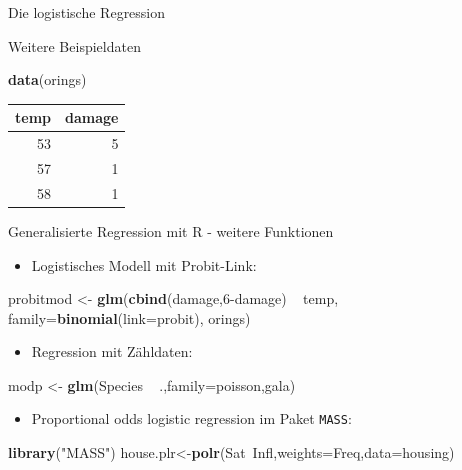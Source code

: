 \documentclass[ignorenonframetext,]{beamer}
\newenvironment{Shaded}{}{}
\newcommand{\KeywordTok}[1]{\textcolor[rgb]{0.00,0.44,0.13}{\textbf{{#1}}}}
\newcommand{\DataTypeTok}[1]{\textcolor[rgb]{0.56,0.13,0.00}{{#1}}}
\newcommand{\DecValTok}[1]{\textcolor[rgb]{0.25,0.63,0.44}{{#1}}}
\newcommand{\StringTok}[1]{\textcolor[rgb]{0.25,0.44,0.63}{{#1}}}
\newcommand{\NormalTok}[1]{{#1}}
\providecommand{\tightlist}{%
\setlength{\itemsep}{0pt}\setlength{\parskip}{0pt}}
\begin{document}
\begin{frame}[fragile]{Die logistische Regression}
\begin{block}{Weitere Beispieldaten}
\begin{Shaded}
\begin{Highlighting}[]
\KeywordTok{data}\NormalTok{(orings)}
\end{Highlighting}
\end{Shaded}

\begin{longtable}[]{@{}rr@{}}
\toprule
temp & damage\tabularnewline
\midrule
\endhead
53 & 5\tabularnewline
57 & 1\tabularnewline
58 & 1\tabularnewline
\bottomrule
\end{longtable}

\end{block}

\begin{block}{Generalisierte Regression mit R - weitere Funktionen}

\begin{itemize}
\tightlist
\item
  Logistisches Modell mit Probit-Link:
\end{itemize}

\begin{Shaded}
\begin{Highlighting}[]
\NormalTok{probitmod <-}\StringTok{ }\KeywordTok{glm}\NormalTok{(}\KeywordTok{cbind}\NormalTok{(damage,}\DecValTok{6}\NormalTok{-damage) ~}\StringTok{ }\NormalTok{temp, }
    \DataTypeTok{family=}\KeywordTok{binomial}\NormalTok{(}\DataTypeTok{link=}\NormalTok{probit), orings)}
\end{Highlighting}
\end{Shaded}

\begin{itemize}
\tightlist
\item
  Regression mit Zähldaten:
\end{itemize}

\begin{Shaded}
\begin{Highlighting}[]
\NormalTok{modp <-}\StringTok{ }\KeywordTok{glm}\NormalTok{(Species ~}\StringTok{ }\NormalTok{.,}\DataTypeTok{family=}\NormalTok{poisson,gala)}
\end{Highlighting}
\end{Shaded}

\begin{itemize}
\tightlist
\item
  Proportional odds logistic regression im Paket \texttt{MASS}:
\end{itemize}

\begin{Shaded}
\begin{Highlighting}[]
\KeywordTok{library}\NormalTok{(}\StringTok{"MASS"}\NormalTok{)}
\NormalTok{house.plr<-}\KeywordTok{polr}\NormalTok{(Sat~Infl,}\DataTypeTok{weights=}\NormalTok{Freq,}\DataTypeTok{data=}\NormalTok{housing)}
\end{Highlighting}
\end{Shaded}


\end{block}
\end{frame}
\end{document}
